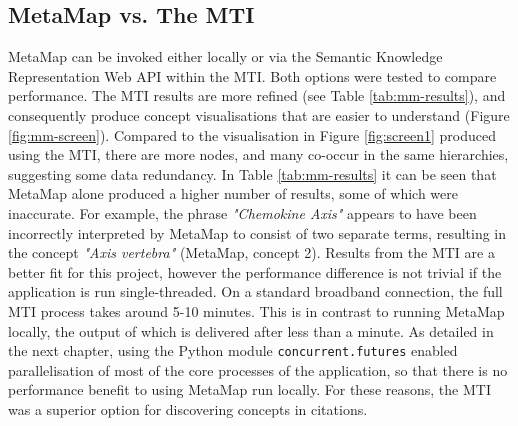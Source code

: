 \documentclass[Report.tex]{subfiles}
\begin{document}
\subsection{MetaMap vs. The MTI}
\noindent MetaMap can be invoked either locally or via the Semantic Knowledge Representation Web API within the MTI. Both options were tested to compare performance. The MTI results are more refined (see Table \ref{tab:mm-results}), and consequently produce concept visualisations that are easier to understand (Figure \ref{fig:mm-screen}). Compared to the visualisation in Figure \ref{fig:screen1} produced using the MTI, there are more nodes, and many co-occur in the same hierarchies, suggesting some data redundancy. In Table \ref{tab:mm-results} it can be seen that MetaMap alone produced a higher number of results, some of which were inaccurate. For example, the phrase \emph{"Chemokine Axis"} appears to have been incorrectly interpreted by MetaMap to consist of two separate terms, resulting in the concept \emph{"Axis vertebra"} (MetaMap, concept 2). Results from the MTI are a better fit for this project, however the performance difference is not trivial if the application is run single-threaded. On a standard broadband connection, the full MTI process takes around 5-10 minutes. This is in contrast to running MetaMap locally, the output of which is delivered after less than a minute. As detailed in the next chapter, using the Python module \texttt{concurrent.futures} enabled parallelisation of most of the core processes of the application, so that there is no performance benefit to using MetaMap run locally. For these reasons, the MTI was a superior option for discovering concepts in citations. \newline
\end{document}
